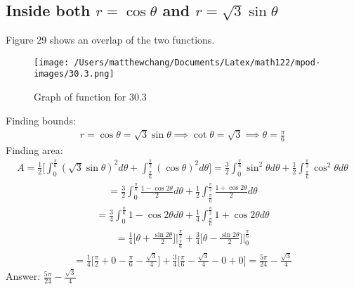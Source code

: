 \documentclass{article}
\begin{document}
\subsection{Inside both $r = \cos{\theta}$ and $r = \sqrt{3} \sin{\theta}$}
Figure 29 shows an overlap of the two functions. \\[10pt]
\begin{figure}
	\centering
	\texttt{[image: /Users/matthewchang/Documents/Latex/math122/mpod-images/30.3.png]}
	\caption{Graph of function for 30.3}
\end{figure}
Finding bounds:
\begin{align*}
	r = \cos{\theta} = \sqrt{3}\sin{\theta} \implies \cot{\theta} = \sqrt{3} \implies \theta = \frac{\pi}{6}
\end{align*}
Finding area:
\begin{align*}
	A = \frac{1}{2} \bigg[ \int_0^{\frac{\pi}{6}} (\sqrt{3}\sin{\theta})^2 d\theta + \int_{\frac{\pi}{6}}^{\frac{\pi}{2}} (\cos{\theta})^2 d\theta \bigg] = \frac{3}{2} \int_0^{\frac{\pi}{6}} \sin^2{\theta} d\theta + \frac{1}{2} \int_{\frac{\pi}{6}}^{\frac{\pi}{2}} \cos^2{\theta} d\theta
\end{align*}
\begin{align*}
	= \frac{3}{2} \int_0^{\frac{\pi}{6}} \frac{1 - \cos{2\theta}}{2} d\theta + \frac{1}{2} \int_{\frac{\pi}{6}}^{\frac{\pi}{2}} \frac{1 + \cos{2\theta}}{2} d\theta 
\end{align*} 
\begin{align*}
	= \frac{3}{4} \int_0^{\frac{\pi}{6}} 1 - \cos{2\theta} d\theta + \frac{1}{4} \int_{\frac{\pi}{6}}^{\frac{\pi}{2}} 1 + \cos{2\theta} d\theta
\end{align*}
\begin{align*}
	= \frac{1}{4} \bigg[ \theta + \frac{\sin{2\theta}}{2} \bigg] \bigg|_{\frac{\pi}{6}}^{\frac{\pi}{2}} + \frac{3}{4} \bigg[ \theta - \frac{\sin{2\theta}}{2} \bigg] \bigg|_0^{\frac{\pi}{6}}
\end{align*}
\begin{align*}
	=\frac{1}{4} \bigg[ \frac{\pi}{2} + 0 - \frac{\pi}{6} - \frac{\sqrt{3}}{4} \bigg] + \frac{3}{4} \bigg[ \frac{\pi}{6} - \frac{\sqrt{3}}{4} - 0 + 0 \bigg] = \frac{5\pi}{24} - \frac{\sqrt{3}}{4}
\end{align*}
Answer: $\frac{5\pi}{24} - \frac{\sqrt{3}}{4}$

\end{document}
